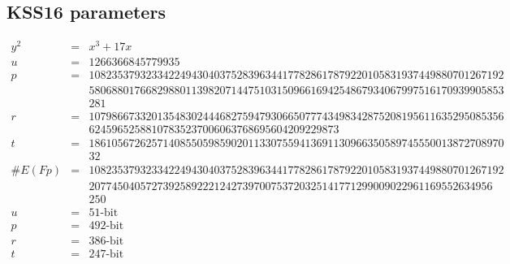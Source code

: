 \begin{appendices}
\section{KSS16 parameters}
\label{appendix:KSS16}
\begin{eqnarray}
y^2 & = & x^3 + 17x \nonumber \\ 
u & = & 1266366845779935 \nonumber \\ 
p & = & 1082353793233422494304037528396344177828617879220105831937449880701267192 \nonumber \\ 
& &  5806880176682988011398207144751031509661694254867934067997516170939905853\nonumber \\
& & 281\nonumber \\
r & = &  1079866733201354830244468275947930665077743498342875208195611635295085356\nonumber \\
& &  62459652588107835237006063768695604209229873\nonumber \\
t & = &  1861056726257140855059859020113307559413691130966350589745550013872708970\nonumber \\
& & 32\nonumber \\
\#E(Fp) & = &  1082353793233422494304037528396344177828617879220105831937449880701267192\nonumber \\
& &  20774504057273925892221242739700753720325141771299009022961169552634956\nonumber \\
&& 250 \nonumber \\
u & = & 51\text{-bit} \nonumber \\
p & = & 492\text{-bit} \nonumber \\
r &  = & 386\text{-bit} \nonumber \\
t & = & 247\text{-bit} \nonumber
\end{eqnarray}
\end{appendices}